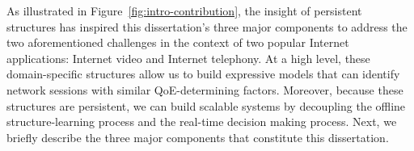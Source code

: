 As illustrated in Figure~\ref{fig:intro-contribution}, 
the insight of persistent structures has inspired this dissertation's 
three major components 
to address the two aforementioned challenges in the context
of two popular Internet applications: Internet video and Internet telephony. 
At a high level, these domain-specific structures 
allow us to build expressive models that can identify network 
sessions with similar QoE-determining factors.
Moreover, because these structures are persistent, we can 
build scalable systems by decoupling the offline structure-learning 
process and the real-time decision making process.
Next, we briefly describe the three major components that constitute 
this dissertation.



